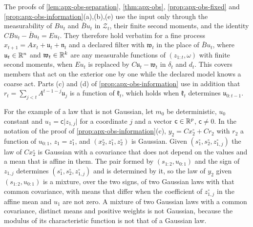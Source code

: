 \begin{remark}\label{rem:apx-obs-acts}
The proofs of \cref{lem:apx-obs-separation}, \cref{thm:apx-obs}, \cref{prop:apx-obs-fixed} and \cref{prop:apx-obs-information}(a),(b),(e) use the input only through the measurability of $Bu_t$ and $\bar Bu_t$ in $\mathcal Z_t$, their finite second moments, and the identity $CBu_t-\bar Bu_t=Eu_t$. They therefore hold verbatim for a fine process $x_{t+1}=Ax_t+\mathfrak u_t+\mathfrak n_t$ and a declared filter with $\mathfrak w_t$ in the place of $\bar Bu_t$, where $\mathfrak u_t\in\mathbb{R}^n$ and $\mathfrak w_t\in\mathbb{R}^k$ are any measurable functions of $(z_{1:t},\omega)$ with finite second moments, when $Eu_t$ is replaced by $C\mathfrak u_t-\mathfrak w_t$ in $\delta_t$ and $d_t$. This covers members that act on the exterior one by one while the declared model knows a coarse act. Parts (c) and (d) of \cref{prop:apx-obs-information} use in addition that $r_t=\sum_{j<t}A^{t-1-j}\mathfrak u_j$ is a function of $\mathfrak k_t$, which holds when $\mathfrak k_t$ determines $\mathfrak u_{0:t-1}$.

For the example of a law that is not Gaussian, let $m_0$ be deterministic, $u_0$ constant and $u_1=\mathsf c\lvert z_{1,j}\rvert$ for a coordinate $j$ and a vector $\mathsf c\in\mathbb{R}^p$, $\mathsf c\ne0$. In the notation of the proof of \cref{prop:apx-obs-information}(c), $y_2=Cx^\circ_2+Cr_2$ with $r_2$ a function of $u_{0:1}$, $z_1=z^\circ_1$, and $(x^\circ_2,z^\circ_1,z^\circ_2)$ is Gaussian. Given $(s^\circ_1,s^\circ_2,z^\circ_{1,j})$ the law of $Cx^\circ_2$ is Gaussian with a covariance that does not depend on the values and a mean that is affine in them. The pair formed by $(s_{1:2},u_{0:1})$ and the sign of $z_{1,j}$ determines $(s^\circ_1,s^\circ_2,z^\circ_{1,j})$ and is determined by it, so the law of $y_2$ given $(s_{1:2},u_{0:1})$ is a mixture, over the two signs, of two Gaussian laws with that common covariance, with means that differ when the coefficient of $z^\circ_{1,j}$ in the affine mean and $u_1$ are not zero. A mixture of two Gaussian laws with a common covariance, distinct means and positive weights is not Gaussian, because the modulus of its characteristic function is not that of a Gaussian law.


\end{remark}
